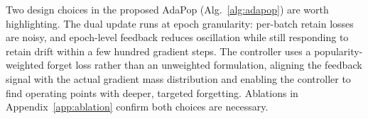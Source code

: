 Two design choices in the proposed AdaPop (Alg.~\ref{alg:adapop}) are worth highlighting. The dual update runs at epoch granularity: per-batch retain losses are noisy, and epoch-level feedback reduces oscillation while still responding to retain drift within a few hundred gradient steps. The controller uses a popularity-weighted forget loss rather than an unweighted formulation, aligning the feedback signal with the actual gradient mass distribution and enabling the controller to find operating points with deeper, targeted forgetting. Ablations in Appendix~\ref{app:ablation} confirm both choices are necessary.







